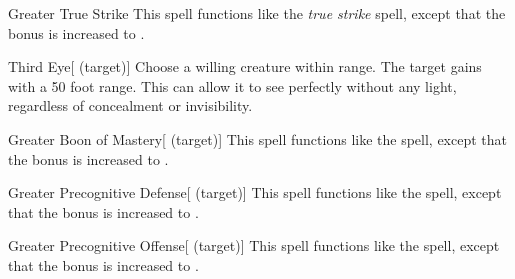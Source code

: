 \lowercase{\hypertarget{spell:Greater True Strike}{}}\label{spell:Greater True Strike}
\begin{apability}[\nth{3}]{\hypertarget{spell:Greater True Strike}{Greater True Strike}}
This spell functions like the \textit{true strike} spell, except that the bonus is increased to .
\end{apability}
\vspace{0.25em}



\lowercase{\hypertarget{spell:Third Eye}{}}\label{spell:Third Eye}
\begin{attuneability}[\nth{3}]{\hypertarget{spell:Third Eye}{Third Eye}}[ (target)]
Choose a willing creature within \rngclose range.
The target gains  with a 50 foot range.
This can allow it to see perfectly without any light, regardless of concealment or invisibility.
\end{attuneability}
\vspace{0.25em}



\lowercase{\hypertarget{spell:Greater Boon of Mastery}{}}\label{spell:Greater Boon of Mastery}
\begin{attuneability}[\nth{4}]{\hypertarget{spell:Greater Boon of Mastery}{Greater Boon of Mastery}}[ (target)]
This spell functions like the  spell, except that the bonus is increased to .
\end{attuneability}
\vspace{0.25em}



\lowercase{\hypertarget{spell:Greater Precognitive Defense}{}}\label{spell:Greater Precognitive Defense}
\begin{attuneability}[\nth{4}]{\hypertarget{spell:Greater Precognitive Defense}{Greater Precognitive Defense}}[ (target)]
This spell functions like the  spell, except that the bonus is increased to .
\end{attuneability}
\vspace{0.25em}



\lowercase{\hypertarget{spell:Greater Precognitive Offense}{}}\label{spell:Greater Precognitive Offense}
\begin{attuneability}[\nth{5}]{\hypertarget{spell:Greater Precognitive Offense}{Greater Precognitive Offense}}[ (target)]
This spell functions like the  spell, except that the bonus is increased to .
\end{attuneability}
\vspace{0.25em}



